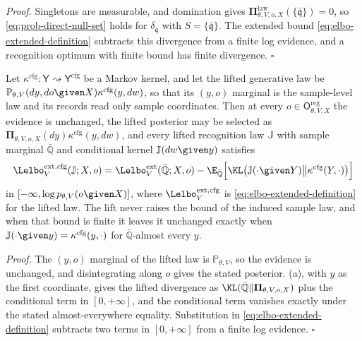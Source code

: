 \noindent\emph{Proof.}
Singletons are measurable, and domination gives
$\boldsymbol\Pi^{\mathrm{law}}_{\theta,V,o,X}(\{\bar{\mathfrak q}\})=0$, so \eqref{eq:prob-direct-null-set} holds for
$\delta_{\bar{\mathfrak q}}$ with $S=\{\bar{\mathfrak q}\}$. The extended bound
\eqref{eq:elbo-extended-definition} subtracts this divergence from a finite log evidence, and a recognition
optimum with finite bound has finite divergence. \hfill$\square$

Let $\kappa^{\mathrm{cfg}}:\mathsf Y\rightsquigarrow\mathsf Y^{\mathrm{cfg}}$ be a Markov kernel, and let the lifted
generative law be $\mathbb P_{\theta,V}(dy,do\given X)\kappa^{\mathrm{cfg}}(y,dw)$, so that its
$(y,o)$ marginal is the sample-level law and its records read only sample coordinates. Then at every
$o\in\mathsf O^{\mathrm{reg}}_{\theta,V,X}$ the evidence is unchanged, the lifted posterior may be selected
as $\boldsymbol\Pi_{\theta,V,o,X}(dy)\kappa^{\mathrm{cfg}}(y,dw)$, and every lifted recognition law $\mathbb J$
with sample marginal $\bar{\mathbb Q}$ and conditional kernel $\mathbb J(dw\given y)$ satisfies
\begin{equation}
\Lelbo^{\mathrm{ext,cfg}}_V(\mathbb J;X,o)
=\Lelbo^{\mathrm{ext}}_V(\bar{\mathbb Q};X,o)
-\E_{\bar{\mathbb Q}}\Bigl[\KL\bigl(\mathbb J(\cdot\given Y)\big\Vert\kappa^{\mathrm{cfg}}(Y,\cdot)\bigr)\Bigr]
\label{eq:prob-configuration-lift-identity}
\end{equation}
in $[-\infty,\log p_{\theta,V}(o\given X)]$, where $\Lelbo^{\mathrm{ext,cfg}}_V$ is
\eqref{eq:elbo-extended-definition} for the lifted law. The lift never raises the bound of the induced
sample law, and when that bound is finite it leaves it unchanged exactly when
$\mathbb J(\cdot\given y)=\kappa^{\mathrm{cfg}}(y,\cdot)$ for $\bar{\mathbb Q}$-almost every $y$.

\noindent\emph{Proof.}
The $(y,o)$ marginal of the lifted law is $\mathbb P_{\theta,V}$, so the evidence is unchanged, and
disintegrating along $o$ gives the stated posterior. (a), with $y$ as the
first coordinate, gives the lifted divergence as $\KL(\bar{\mathbb Q}\Vert\boldsymbol\Pi_{\theta,V,o,X})$ plus
the conditional term in $[0,+\infty]$, and the conditional term vanishes exactly under the stated
almost-everywhere equality. Substitution in
\eqref{eq:elbo-extended-definition} subtracts two terms in $[0,+\infty]$ from a finite log evidence.
\hfill$\square$

